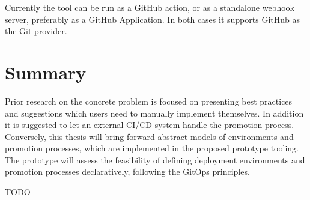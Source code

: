 Currently the tool can be run as a GitHub action, or as a
standalone webhook server, preferably as a GitHub Application.
In both cases it supports GitHub as the Git provider.

\section{Summary}

\noindent
Prior research on the concrete problem is focused on presenting
best practices and suggestions
which users need to manually implement themselves.
In addition it is suggested to let an external CI/CD system handle the promotion process.
Conversely, this thesis will bring forward
abstract models of environments and promotion processes,
which are implemented in the proposed prototype tooling.
The prototype will assess the feasibility of
defining deployment environments and promotion processes declaratively,
following the GitOps principles.

TODO



























